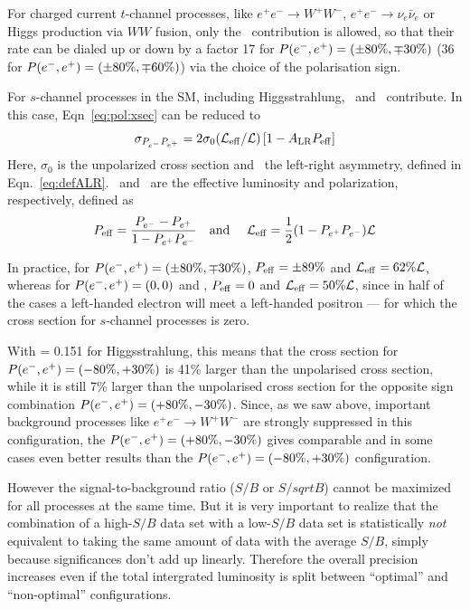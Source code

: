 For charged current $t$-channel processes, like $e^+e^- \to W^+W^-$, $e^+e^- \to \nu_e\bar{\nu}_e$ or Higgs production via $WW$ fusion, only the \sigmaLR\ contribution is allowed, so that their rate can be dialed up or down by a factor 17 for $P(e^-,e^+)=(\pm 80\%,\mp 30\%)$ (36 for $P(e^-,e^+)=(\pm 80\%,\mp 60\%)$) via the choice of the polarisation sign. 

For $s$-channel processes in the SM, including Higgsstrahlung, \sigmaLR\ and \sigmaRL\ contribute. In this case, Eqn~\ref{eq:pol:xsec} can be reduced to
\begin{equation}
 \sigma_{P_{e^-}P_{e^+}} = 2 \sigma_0 (\mathcal{L}_{\mathrm{eff}}/\mathcal{L}) \left[1 - A_{\mathrm{LR}} P_{\mathrm{eff}} \right]
\label{eq:pol:xsecschan}
\end{equation}
Here, $\sigma_0$ is the unpolarized cross section and \ALR\ 
the left-right asymmetry, defined in Eqn.~\ref{eq:defALR}. \Leff\ and \Peff\  
are the effective luminosity and polarization, respectively, defined as
\begin{equation}
P_{\mathrm{eff}}= \frac{P_{e^-} - P_{e^+}}{1 - P_{e^+}P_{e^-}}
\label{eq:def-leff-peff}
\quad\mbox{\rm and }\quad
\mathcal{L}_{\mathrm{eff}}=\frac{1}{2}(1 -P_{e^+}P_{e^-}){\cal L}
\end{equation}

In practice, for $P(e^-,e^+)=(\pm 80\%,\mp 30\%)$, $P_{\mathrm{eff}} = \pm 89\%$ and $\mathcal{L}_{\mathrm{eff}} = 62\% \mathcal{L}$, whereas for $P(e^-,e^+)=(0,0)$ and , $P_{\mathrm{eff}} = 0$ and $\mathcal{L}_{\mathrm{eff}} = 50\% \mathcal{L}$, since in half of the cases a left-handed electron will meet a left-handed positron --- for which the cross section for $s$-channel processes is zero. 

With \ALR = 0.151 for Higgsstrahlung, this means that the cross section for $P(e^-,e^+)=(-80\%,+30\%)$ is 41\% larger than the unpolarised cross section, while it is
still 7\% larger than the unpolarised cross section for the opposite sign combination  $P(e^-,e^+)=(+80\%,-30\%)$. Since, as we saw above, important background processes like $e^+e^- \to W^+W^-$ are strongly suppressed in this configuration, the $P(e^-,e^+)=(+80\%,-30\%)$ gives comparable and in some cases even better results than the $P(e^-,e^+)=(-80\%,+30\%)$ configuration. 

However the signal-to-background ratio ($S/B$ or $S/sqrt{B}$) cannot be maximized for all processes at the same time. But it is very important to realize that the combination of a high-$S/B$ data set with a low-$S/B$ data set is statistically {\em not} equivalent to taking 
the same amount of data with the average $S/B$, simply because significances don't add up linearly. Therefore the overall precision increases even if the total intergrated luminosity is split between ``optimal'' and ``non-optimal'' configurations. 

